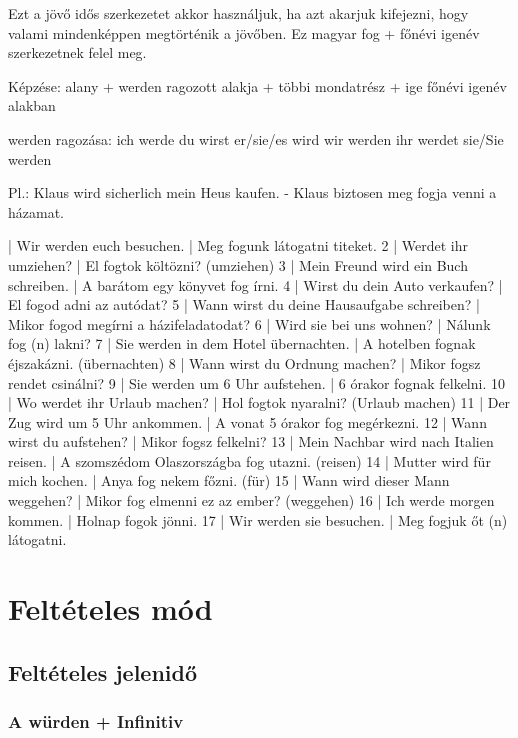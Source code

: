 \documentclass{article}
\newenvironment{desc}{\verbatim}{\endverbatim}
\newenvironment{exmp}{\verbatim}{\endverbatim}
\begin{document}
\begin{desc}
Ezt a jövő idős szerkezetet akkor használjuk, ha azt akarjuk kifejezni, hogy valami mindenképpen megtörténik a jövőben. Ez magyar fog + főnévi igenév szerkezetnek felel meg.

Képzése: alany + werden ragozott alakja + többi mondatrész + ige főnévi igenév alakban

werden ragozása:
ich werde
du wirst
er/sie/es wird
wir werden
ihr werdet
sie/Sie werden

Pl.: Klaus wird sicherlich mein Heus kaufen. - Klaus biztosen meg fogja venni a házamat.
\end{desc}

\begin{exmp}
1 | Wir werden euch besuchen. | Meg fogunk látogatni titeket.
2 | Werdet ihr umziehen? | El fogtok költözni? (umziehen)
3 | Mein Freund wird ein Buch schreiben. | A barátom egy könyvet fog írni.
4 | Wirst du dein Auto verkaufen? | El fogod adni az autódat?
5 | Wann wirst du deine Hausaufgabe schreiben? | Mikor fogod megírni a házifeladatodat?
6 | Wird sie bei uns wohnen? | Nálunk fog (n) lakni?
7 | Sie werden in dem Hotel übernachten. | A hotelben fognak éjszakázni. (übernachten)
8 | Wann wirst du Ordnung machen? | Mikor fogsz rendet csinálni?
9 | Sie werden um 6 Uhr aufstehen. | 6 órakor fognak felkelni.
10 | Wo werdet ihr Urlaub machen? | Hol fogtok nyaralni? (Urlaub machen)
11 | Der Zug wird um 5 Uhr ankommen. | A vonat 5 órakor fog megérkezni.
12 | Wann wirst du aufstehen? | Mikor fogsz felkelni?
13 | Mein Nachbar wird nach Italien reisen. | A szomszédom Olaszországba fog utazni. (reisen)
14 | Mutter wird für mich kochen. | Anya fog nekem főzni. (für)
15 | Wann wird dieser Mann weggehen? | Mikor fog elmenni ez az ember? (weggehen)
16 | Ich werde morgen kommen. | Holnap fogok jönni.
17 | Wir werden sie besuchen. | Meg fogjuk őt (n) látogatni.
\end{exmp}

\section{Feltételes mód}

\subsection{Feltételes jelenidő}

\subsubsection{A würden + Infinitiv}
\end{document}
